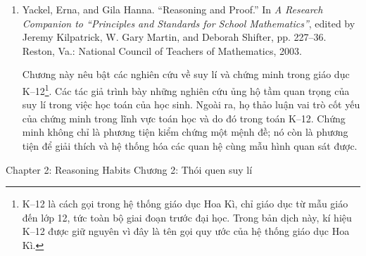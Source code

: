{{\begin{enumerate}
          \par\noindent\hspace*{1em} Trong nghiên cứu này về quan niệm của giáo viên toán bậc trung học đối với chứng minh, Knuth trình bày một khung lí thuyết nhằm giúp hiểu vai trò của chứng minh trong toán học nhà trường. Khung lí thuyết này dựa trên các nghiên cứu khác và cung cấp một cách hữu ích để suy nghĩ về mục đích của chứng minh trong chương trình học toán. Theo khung của Knuth, chứng minh là cơ chế để kiểm chứng và giải thích mệnh đề đúng, giao tiếp toán học, tạo ra và khám phá ý tưởng toán học mới, đồng thời tổ chức ý tưởng sao cho chúng trở thành một phần của cấu trúc tiên đề.\vspace{.35\baselineskip}

        \item Yackel, Erna, and Gila Hanna. ``Reasoning and Proof.'' In \emph{A Research Companion to ``Principles and Standards for School Mathematics''}, edited by Jeremy Kilpatrick, W. Gary Martin, and Deborah Shifter, pp. 227--36. Reston, Va.: National Council of Teachers of Mathematics, 2003.\vspace{.25\baselineskip}

          \par\noindent\hspace*{1em} Chương này nêu bật các nghiên cứu về suy lí và chứng minh trong giáo dục K--12\footnote{K--12 là cách gọi trong hệ thống giáo dục Hoa Kì, chỉ giáo dục từ mẫu giáo đến lớp 12, tức toàn bộ giai đoạn trước đại học. Trong bản dịch này, kí hiệu K--12 được giữ nguyên vì đây là tên gọi quy ước của hệ thống giáo dục Hoa Kì.}. Các tác giả trình bày những nghiên cứu ủng hộ tầm quan trọng của suy lí trong việc học toán của học sinh. Ngoài ra, họ thảo luận vai trò cốt yếu của chứng minh trong lĩnh vực toán học và do đó trong toán K--12. Chứng minh không chỉ là phương tiện kiểm chứng một mệnh đề; nó còn là phương tiện để giải thích và hệ thống hóa các quan hệ cùng mẫu hình quan sát được.
      \end{enumerate}}
  }{\NOTE{}}

\clearpage
\ParallelSection
  {Chapter 2: Reasoning Habits}
  {Chương 2: Thói quen suy lí}
  {}

